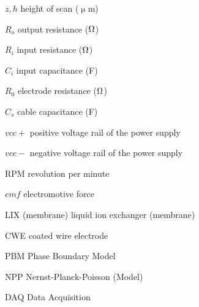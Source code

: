 $z, h$ \dotfill height of scan ($\upmu$m)

$R_o$ \dotfill output resistance ($\ohm$)

$R_i$ \dotfill input resistance ($\ohm$)

$C_i$ \dotfill input capacitance (F)

$R_0$ \dotfill electrode resistance ($\ohm$)

$C_s$ \dotfill cable capacitance (F)

$vcc+$ \dotfill positive voltage rail of the power supply

$vcc-$ \dotfill negative voltage rail of the power supply

RPM \dotfill revolution per minute

$emf$ \dotfill electromotive force

LIX (membrane) \dotfill liquid ion exchanger (membrane)

CWE \dotfill coated wire electrode

PBM \dotfill Phase Boundary Model

NPP \dotfill Nernst-Planck-Poisson (Model)

DAQ \dotfill Data Acquisition
